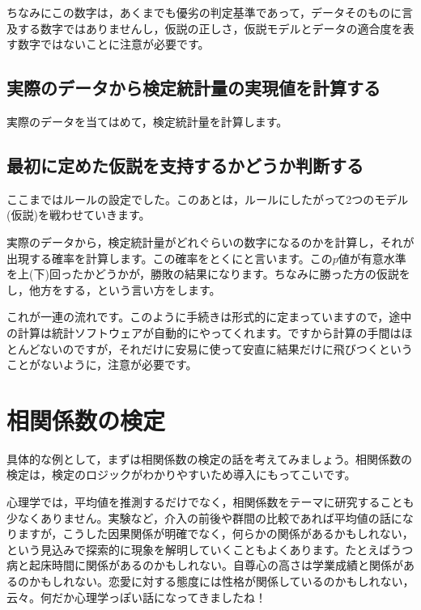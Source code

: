 \documentclass{ltjsbook}
\begin{document}
ちなみにこの数字は，あくまでも優劣の判定基準であって，データそのものに言及する数字ではありませんし，仮説の正しさ，仮説モデルとデータの適合度を表す数字ではないことに注意が必要です。

\subsection{実際のデータから検定統計量の実現値を計算する}

実際のデータを当てはめて，検定統計量を計算します。
\subsection{最初に定めた仮説を支持するかどうか判断する}
ここまではルールの設定でした。このあとは，ルールにしたがって2つのモデル(仮説)を戦わせていきます。

実際のデータから，検定統計量がどれぐらいの数字になるのかを計算し，それが出現する確率を計算します。この確率をとくにと言います。この$p$値が有意水準を上(下)回ったかどうかが，勝敗の結果になります。ちなみに勝った方の仮説をし，他方をする，という言い方をします。

これが一連の流れです。このように手続きは形式的に定まっていますので，途中の計算は統計ソフトウェアが自動的にやってくれます。ですから計算の手間はほとんどないのですが，それだけに安易に使って安直に結果だけに飛びつくということがないように，注意が必要です。

\section{相関係数の検定}

具体的な例として，まずは相関係数の検定の話を考えてみましょう。相関係数の検定は，検定のロジックがわかりやすいため導入にもってこいです。


心理学では，平均値を推測するだけでなく，相関係数をテーマに研究することも少なくありません。実験など，介入の前後や群間の比較であれば平均値の話になりますが，こうした因果関係が明確でなく，何らかの関係があるかもしれない，という見込みで探索的に現象を解明していくこともよくあります。たとえばうつ病と起床時間に関係があるのかもしれない。自尊心の高さは学業成績と関係があるのかもしれない。恋愛に対する態度には性格が関係しているのかもしれない，云々。何だか心理学っぽい話になってきましたね！
\end{document}
